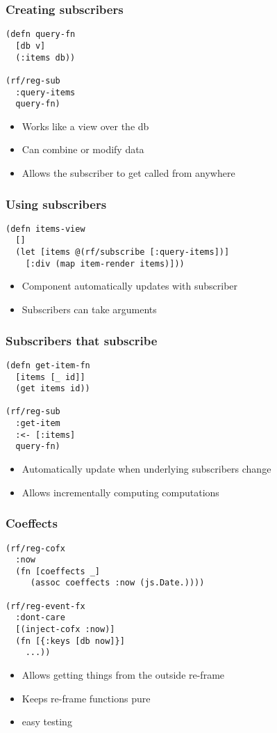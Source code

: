\documentclass{beamer}
\begin{document}
  \begin{frame}[fragile]
    \frametitle{Creating subscribers}
    \begin{verbatim}
(defn query-fn
  [db v]
  (:items db))

(rf/reg-sub
  :query-items
  query-fn)
    \end{verbatim}
    \begin{itemize}
      \item Works like a view over the db
      \item Can combine or modify data
      \item Allows the subscriber to get called from anywhere
    \end{itemize}
  \end{frame}

  \begin{frame}[fragile]
    \frametitle{Using subscribers}
    \begin{verbatim}
(defn items-view
  []
  (let [items @(rf/subscribe [:query-items])]
    [:div (map item-render items)]))
    \end{verbatim}
    \begin{itemize}
      \item Component automatically updates with subscriber
      \item Subscribers can take arguments
    \end{itemize}
  \end{frame}

  \begin{frame}[fragile]
    \frametitle{Subscribers that subscribe}
    \begin{verbatim}
(defn get-item-fn
  [items [_ id]]
  (get items id))

(rf/reg-sub
  :get-item
  :<- [:items]
  query-fn)
    \end{verbatim}
    \begin{itemize}
      \item Automatically update when underlying subscribers change
      \item Allows incrementally computing computations
    \end{itemize}
  \end{frame}

  \begin{frame}[fragile]
    \frametitle{Coeffects}
    \begin{verbatim}
(rf/reg-cofx
  :now
  (fn [coeffects _]
     (assoc coeffects :now (js.Date.))))

(rf/reg-event-fx
  :dont-care
  [(inject-cofx :now)]
  (fn [{:keys [db now]}]
    ...))
    \end{verbatim}
    \begin{itemize}
      \item Allows getting things from the outside re-frame
      \item Keeps re-frame functions pure
      \item easy testing
    \end{itemize}
  \end{frame}
\end{document}
